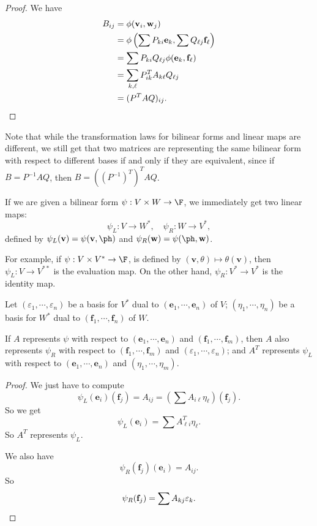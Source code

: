 \documentclass[a4paper]{article}
\begin{document}
\begin{proof}
  We have
  \begin{align*}
    B_{ij} &= \phi(\mathbf{v}_i, \mathbf{w}_j)\\
    &= \phi\left(\sum P_{ki}\mathbf{e}_k, \sum Q_{\ell j}\mathbf{f}_\ell\right)\\
    &= \sum P_{ki}Q_{\ell j}\phi(\mathbf{e}_k, \mathbf{f}_\ell)\\
    &= \sum_{k, \ell} P^T_{ik} A_{k\ell} Q_{\ell j}\\
    &= (P^T AQ)_{ij}.\qedhere
  \end{align*}
\end{proof}
Note that while the transformation laws for bilinear forms and linear maps are different, we still get that two matrices are representing the same bilinear form with respect to different bases if and only if they are equivalent, since if $B = P^{-1} AQ$, then $B = ((P^{-1})^T)^T AQ$.

If we are given a bilinear form $\psi: V\times W \to \F$, we immediately get two linear maps:
\[
  \psi_L: V\to W^*,\quad \psi_R: W \to V^*,
\]
defined by $\psi_L(\mathbf{v}) = \psi(\mathbf{v}, \ph)$ and $\psi_R(\mathbf{w}) = \psi(\ph, \mathbf{w})$.

For example, if $\psi: V\times V^* \to \F$, is defined by $(\mathbf{v}, \theta) \mapsto \theta(\mathbf{v})$, then $\psi_L: V\to V^{**}$ is the evaluation map. On the other hand, $\psi_R: V^* \to V^*$ is the identity map.

\begin{lemma}
  Let $(\varepsilon_1,\cdots, \varepsilon_n)$ be a basis for $V^*$ dual to $(\mathbf{e}_1, \cdots, \mathbf{e}_n)$ of $V$; $(\eta_1,\cdots, \eta_n)$ be a basis for $W^*$ dual to $(\mathbf{f}_1, \cdots, \mathbf{f}_n)$ of $W$.

  If $A$ represents $\psi$ with respect to $(\mathbf{e}_1, \cdots, \mathbf{e}_n)$ and $(\mathbf{f}_1, \cdots, \mathbf{f}_m)$, then $A$ also represents $\psi_R$ with respect to $(\mathbf{f}_1,\cdots, \mathbf{f}_m)$ and $(\varepsilon_1, \cdots, \varepsilon_n)$; and $A^T$ represents $\psi_L$ with respect to $(\mathbf{e}_1, \cdots, \mathbf{e}_n)$ and $(\eta_1, \cdots, \eta_m)$.
\end{lemma}

\begin{proof}
  We just have to compute
  \[
    \psi_L(\mathbf{e}_i)(\mathbf{f}_j) = A_{ij} = \left(\sum A_{i\ell} \eta_\ell\right) (\mathbf{f}_j).
  \]
  So we get
  \[
    \psi_L(\mathbf{e}_i) = \sum A_{\ell i}^T\eta_\ell.
  \]
  So $A^T$ represents $\psi_L$.

  We also have
  \[
    \psi_R(\mathbf{f}_j)(\mathbf{e}_i) = A_{ij}.
  \]
  So
  \[
    \psi_R(\mathbf{f}_j) = \sum A_{kj}\varepsilon_k.\qedhere
  \]
\end{proof}
\end{document}
